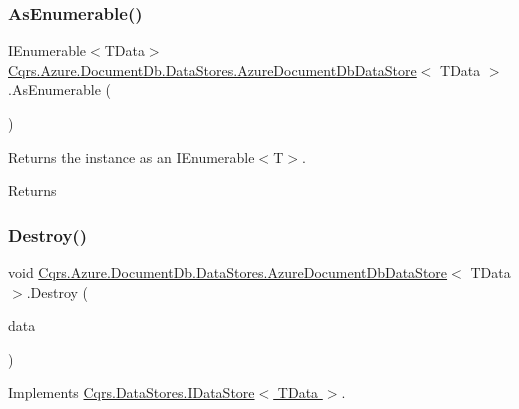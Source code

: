 \subsubsection{\texorpdfstring{As\+Enumerable()}{AsEnumerable()}}
{\footnotesize\ttfamily I\+Enumerable$<$T\+Data$>$ \hyperlink{classCqrs_1_1Azure_1_1DocumentDb_1_1DataStores_1_1AzureDocumentDbDataStore}{Cqrs.\+Azure.\+Document\+Db.\+Data\+Stores.\+Azure\+Document\+Db\+Data\+Store}$<$ T\+Data $>$.As\+Enumerable (\begin{DoxyParamCaption}{ }\end{DoxyParamCaption})}



Returns the instance as an I\+Enumerable$<$\+T$>$. 

\begin{DoxyReturn}{Returns}

\end{DoxyReturn}
\mbox{\label{classCqrs_1_1Azure_1_1DocumentDb_1_1DataStores_1_1AzureDocumentDbDataStore_affe39fe57e590555256258fa6c568c29_affe39fe57e590555256258fa6c568c29}} 
\subsubsection{\texorpdfstring{Destroy()}{Destroy()}}
{\footnotesize\ttfamily void \hyperlink{classCqrs_1_1Azure_1_1DocumentDb_1_1DataStores_1_1AzureDocumentDbDataStore}{Cqrs.\+Azure.\+Document\+Db.\+Data\+Stores.\+Azure\+Document\+Db\+Data\+Store}$<$ T\+Data $>$.Destroy (\begin{DoxyParamCaption}\item[{T\+Data}]{data }\end{DoxyParamCaption})}



Implements \hyperlink{interfaceCqrs_1_1DataStores_1_1IDataStore_aa7ade96f2f3151d5353cf7bdbb2baec5_aa7ade96f2f3151d5353cf7bdbb2baec5}{Cqrs.\+Data\+Stores.\+I\+Data\+Store$<$ T\+Data $>$}.

